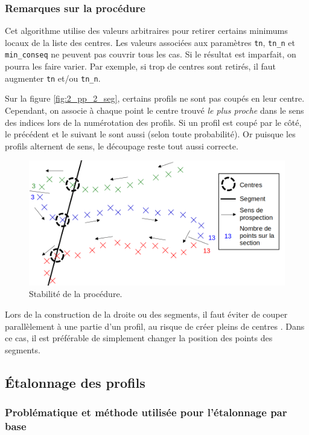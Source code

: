 \documentclass[12pt]{article}
\begin{document}
    \subsubsection{Remarques sur la procédure}

    Cet algorithme utilise des valeurs arbitraires pour retirer certains minimums locaux de la liste des centres. Les valeurs associées aux paramètres \texttt{tn}, \texttt{tn\_n} et \texttt{min\_conseq} ne peuvent pas couvrir tous les cas. Si le résultat est imparfait, on pourra les faire varier. Par exemple, si trop de centres sont retirés, il faut augmenter \texttt{tn} et/ou \texttt{tn\_n}.

    Sur la figure \ref{fig:2_pp_2_seg}, certains profils ne sont pas coupés en leur centre. Cependant, on associe à chaque point le centre trouvé \textit{le plus proche} dans le sens des indices lors de la numérotation des profils. Si un profil est coupé par le côté, le précédent et le suivant le sont aussi (selon toute probabilité). Or puisque les profils alternent de sens, le découpage reste tout aussi correcte.

    \begin{figure}[ht!]
        \centering
        \includegraphics[width=\textwidth]{Images/PseudoProf_sch.png}  
        \caption{Stabilité de la procédure.}
    \end{figure}

    Lors de la construction de la droite ou des segments, il faut éviter de couper parallèlement à une partie d'un profil, au risque de créer pleins de centres . Dans ce cas, il est préférable de simplement changer la position des points des segments.
    
\newpage  
\subsection{Étalonnage des profils}\label{2-etal}
\subsubsection{Problématique et méthode utilisée pour l'étalonnage par base}
\end{document}
